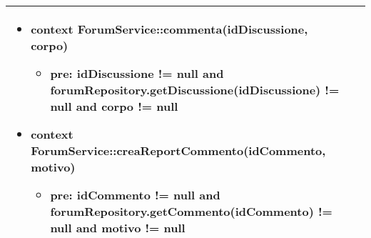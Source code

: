 \begin{tabular}{|| l | p{28em} ||}
\begin{itemize}[leftmargin=*]
		\item \textbf{context} ForumService::commenta(idDiscussione, corpo)
		\begin{itemize}
			\item[ ] \textbf{pre:} idDiscussione != null and forumRepository.getDiscussione(idDiscussione) != null and corpo != null
		\end{itemize}

		\item \textbf{context} ForumService::creaReportCommento(idCommento, motivo)
		\begin{itemize}
			\item[ ] \textbf{pre:} idCommento != null and forumRepository.getCommento(idCommento) != null and motivo != null
		\end{itemize}
	\end{itemize}\\
	\hline
\end{tabular}

